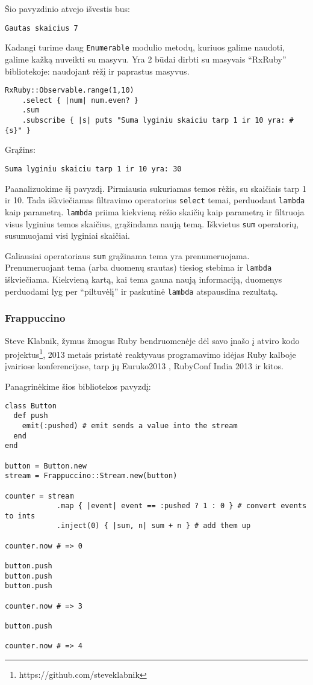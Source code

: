 Šio pavyzdinio atvejo išvestis bus:

\begin{lstlisting}[]
  Gautas skaicius 7
\end{lstlisting}

Kadangi turime daug \lstinline|Enumerable| modulio metodų, kuriuos galime naudoti, galime kažką nuveikti su masyvu. Yra 2 būdai dirbti su masyvais ``RxRuby'' bibliotekoje: naudojant rėžį ir paprastus masyvus.

\begin{lstlisting}[]
  RxRuby::Observable.range(1,10)
    .select { |num| num.even? }
    .sum
    .subscribe { |s| puts "Suma lyginiu skaiciu tarp 1 ir 10 yra: #{s}" }
\end{lstlisting}

Grąžins:

\begin{lstlisting}[]
  Suma lyginiu skaiciu tarp 1 ir 10 yra: 30
\end{lstlisting}

Paanalizuokime šį pavyzdį. Pirmiausia sukuriamas temos rėžis, su skaičiais tarp 1 ir 10. Tada iškviečiamas filtravimo operatorius \lstinline|select| temai, perduodant \lstinline|lambda| kaip parametrą. \lstinline|lambda| priima kiekvieną rėžio skaičių kaip parametrą ir filtruoja visus lyginius temos skaičius, grąžindama naują temą. Iškvietus \lstinline|sum| operatorių, susumuojami visi lyginiai skaičiai.

Galiausiai operatoriaus \lstinline|sum| grąžinama tema yra prenumeruojama. Prenumeruojant tema (arba duomenų srautas) tiesiog stebima ir \lstinline|lambda| iškviečiama. Kiekvieną kartą, kai tema gauna naują informaciją, duomenys perduodami lyg per ``piltuvėlį'' ir paskutinė \lstinline|lambda| atspausdina rezultatą.

\subsubsection{Frappuccino}

Steve Klabnik, žymus žmogus Ruby bendruomenėje dėl savo įnašo į atviro kodo projektus\footnote{https://github.com/steveklabnik}, 2013 metais pristatė reaktyvaus programavimo idėjas Ruby kalboje įvairiose konferencijose, tarp jų Euruko2013 \cite{klabnik:euruko}, RubyConf India 2013 \cite{klabnik:india} ir kitos.

Panagrinėkime šios bibliotekos pavyzdį:

\begin{lstlisting}[]
class Button
  def push
    emit(:pushed) # emit sends a value into the stream
  end
end

button = Button.new
stream = Frappuccino::Stream.new(button)

counter = stream
            .map { |event| event == :pushed ? 1 : 0 } # convert events to ints
            .inject(0) { |sum, n| sum + n } # add them up

counter.now # => 0

button.push
button.push
button.push

counter.now # => 3

button.push

counter.now # => 4
\end{lstlisting}

